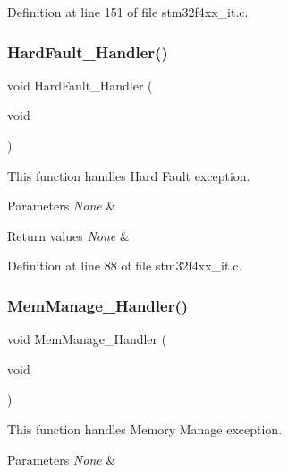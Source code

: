 Definition at line 151 of file stm32f4xx\+\_\+it.\+c.

\mbox{\label{group___templates_ga2bffc10d5bd4106753b7c30e86903bea}} 
\subsubsection{\texorpdfstring{Hard\+Fault\+\_\+\+Handler()}{HardFault\_Handler()}}
{\footnotesize\ttfamily void Hard\+Fault\+\_\+\+Handler (\begin{DoxyParamCaption}\item[{void}]{ }\end{DoxyParamCaption})}



This function handles Hard Fault exception. 


\begin{DoxyParams}{Parameters}
{\em None} & \\
\hline
\end{DoxyParams}

\begin{DoxyRetVals}{Return values}
{\em None} & \\
\hline
\end{DoxyRetVals}


Definition at line 88 of file stm32f4xx\+\_\+it.\+c.

\mbox{\label{group___templates_ga3150f74512510287a942624aa9b44cc5}} 
\subsubsection{\texorpdfstring{Mem\+Manage\+\_\+\+Handler()}{MemManage\_Handler()}}
{\footnotesize\ttfamily void Mem\+Manage\+\_\+\+Handler (\begin{DoxyParamCaption}\item[{void}]{ }\end{DoxyParamCaption})}



This function handles Memory Manage exception. 


\begin{DoxyParams}{Parameters}
{\em None} & \\
\hline
\end{DoxyParams}


